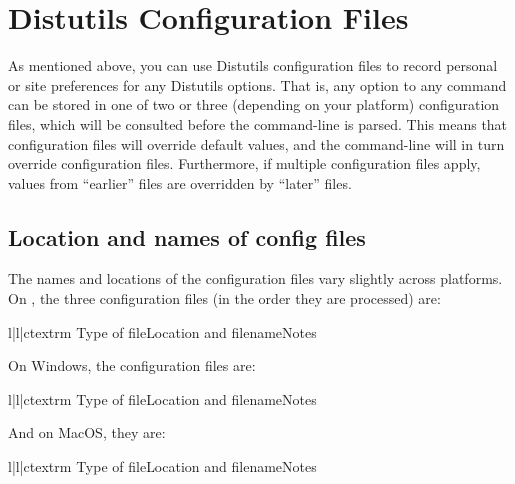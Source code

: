 \documentclass{howto}
\begin{document}
\section{Distutils Configuration Files}
\label{config-files}

As mentioned above, you can use Distutils configuration files to record
personal or site preferences for any Distutils options.  That is, any
option to any command can be stored in one of two or three (depending on
your platform) configuration files, which will be consulted before the
command-line is parsed.  This means that configuration files will
override default values, and the command-line will in turn override
configuration files.  Furthermore, if multiple configuration files
apply, values from ``earlier'' files are overridden by ``later'' files.


\subsection{Location and names of config files}
\label{config-filenames}

The names and locations of the configuration files vary slightly across
platforms.  On \UNIX, the three configuration files (in the order they
are processed) are:
\begin{tableiii}{l|l|c}{textrm}
  {Type of file}{Location and filename}{Notes}
\end{tableiii}

On Windows, the configuration files are:
\begin{tableiii}{l|l|c}{textrm}
  {Type of file}{Location and filename}{Notes}
\end{tableiii}

And on MacOS, they are:
\begin{tableiii}{l|l|c}{textrm}
  {Type of file}{Location and filename}{Notes}
\end{tableiii}
\end{document}
